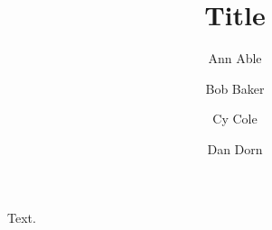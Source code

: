 \documentclass{achemso}
\author{Ann Able}
\author{Bob Baker}
\author{Cy Cole}
\affiliation{Univ A}
\author{Dan Dorn}
\affiliation{Univ C}
\title{Title}
\begin{document}
Text.
\end{document}
